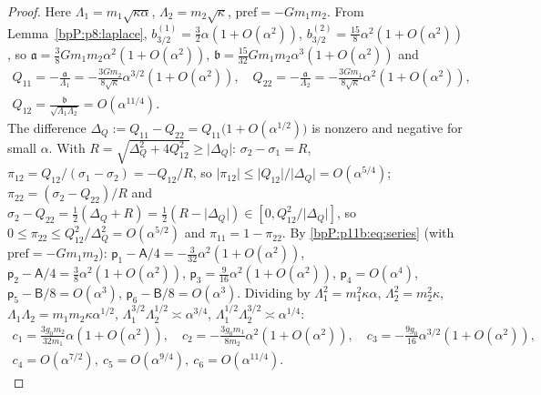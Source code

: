 \begin{proof}
\label{stepP:p11b:as-in} Here $\Lambda_1=m_1\sqrt{\kappa\alpha}$, $\Lambda_2=m_2\sqrt\kappa$, $\mathrm{pref}=-Gm_1m_2$. From Lemma~\ref{bpP:p8:laplace}, $b_{3/2}^{(1)}=\tfrac32\alpha(1+O(\alpha^2))$, $b_{3/2}^{(2)}=\tfrac{15}8\alpha^2(1+O(\alpha^2))$, so $\mathfrak a=\tfrac38Gm_1m_2\alpha^2(1+O(\alpha^2))$, $\mathfrak b=\tfrac{15}{32}Gm_1m_2\alpha^3(1+O(\alpha^2))$ and
\begin{gather*}Q_{11}=-\frac{\mathfrak a}{\Lambda_1}=-\frac{3Gm_2}{8\sqrt\kappa}\alpha^{3/2}(1+O(\alpha^2)),\quad Q_{22}=-\frac{\mathfrak a}{\Lambda_2}=-\frac{3Gm_1}{8\sqrt\kappa}\alpha^2(1+O(\alpha^2)),\\ Q_{12}=\frac{\mathfrak b}{\sqrt{\Lambda_1\Lambda_2}}=O(\alpha^{11/4}).\end{gather*}
The difference $\Delta_Q:=Q_{11}-Q_{22}=Q_{11}\big(1+O(\alpha^{1/2})\big)$ is nonzero and negative for small $\alpha$.
\label{stepP:p11b:as-pi} With $R=\sqrt{\Delta_Q^2+4Q_{12}^2}\ge\lvert\Delta_Q\rvert$: $\sigma_2-\sigma_1=R$, $\pi_{12}=Q_{12}/(\sigma_1-\sigma_2)=-Q_{12}/R$, so $\lvert\pi_{12}\rvert\le\lvert Q_{12}\rvert/\lvert\Delta_Q\rvert=O(\alpha^{5/4})$; $\pi_{22}=(\sigma_2-Q_{22})/R$ and $\sigma_2-Q_{22}=\tfrac12(\Delta_Q+R)=\tfrac12(R-\lvert\Delta_Q\rvert)\in[0,Q_{12}^2/\lvert\Delta_Q\rvert]$, so $0\le\pi_{22}\le Q_{12}^2/\Delta_Q^2=O(\alpha^{5/2})$ and $\pi_{11}=1-\pi_{22}$.
\label{stepP:p11b:as-c} By \eqref{bpP:p11b:eq:series} (with $\mathrm{pref}=-Gm_1m_2$): $\mathsf p_1-\mathsf A/4=-\tfrac3{32}\alpha^2(1+O(\alpha^2))$, $\mathsf p_2-\mathsf A/4=\tfrac38\alpha^2(1+O(\alpha^2))$, $\mathsf p_3=\tfrac9{16}\alpha^2(1+O(\alpha^2))$, $\mathsf p_4=O(\alpha^4)$, $\mathsf p_5-\mathsf B/8=O(\alpha^3)$, $\mathsf p_6-\mathsf B/8=O(\alpha^3)$. Dividing by $\Lambda_1^2=m_1^2\kappa\alpha$, $\Lambda_2^2=m_2^2\kappa$, $\Lambda_1\Lambda_2=m_1m_2\kappa\alpha^{1/2}$, $\Lambda_1^{3/2}\Lambda_2^{1/2}\asymp\alpha^{3/4}$, $\Lambda_1^{1/2}\Lambda_2^{3/2}\asymp\alpha^{1/4}$:
\begin{gather*}c_1=\frac{3g_0m_2}{32m_1}\alpha(1+O(\alpha^2)),\quad c_2=-\frac{3g_0m_1}{8m_2}\alpha^2(1+O(\alpha^2)),\quad c_3=-\frac{9g_0}{16}\alpha^{3/2}(1+O(\alpha^2)),\\ c_4=O(\alpha^{7/2}),\ c_5=O(\alpha^{9/4}),\ c_6=O(\alpha^{11/4}).\end{gather*}

\end{proof}
